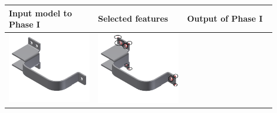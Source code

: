 \begin{minipage}[t]{0.9\linewidth}
\begin{tabular}[h]{@{} p{0.3\linewidth} | p{0.3\linewidth} | p{0.3\linewidth}@{}} \toprule

\textbf{Input model to Phase I} & \textbf{Selected features} & \textbf{Output of Phase I} \\ \midrule

\includegraphics[width=0.98\linewidth]{..//Common/images/DefeatBracketPhase_I_1} &
\includegraphics[width=0.98\linewidth]{..//Common/images/DefeatBracketPhase_I_2_circled} &

\end{tabular}
\end{minipage}
